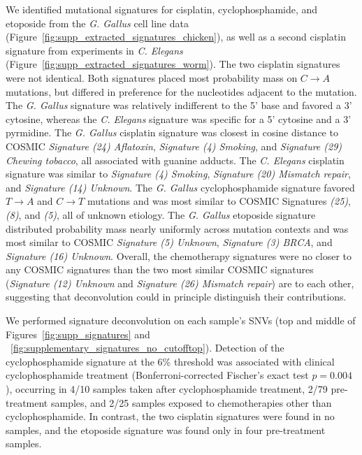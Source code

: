 We identified mutational signatures for cisplatin, cyclophosphamide, and etoposide from the \textit{G. Gallus} cell line data (Figure~\ref{fig:supp_extracted_signatures_chicken}), as well as a second cisplatin signature from experiments in \textit{C. Elegans} (Figure~\ref{fig:supp_extracted_signatures_worm}). The two cisplatin signatures were not identical. Both signatures placed most probability mass on $C \rightarrow A$ mutations, but differed in preference for the nucleotides adjacent to the mutation. The \textit{G. Gallus} signature was relatively indifferent to the 5' base and favored a 3' cytosine, whereas the \textit{C. Elegans} signature was specific for a 5' cytosine and a 3' pyrmidine. The \textit{G. Gallus} cisplatin signature was closest in cosine distance to COSMIC \textit{Signature (24) Aflatoxin}, \textit{Signature (4) Smoking}, and \textit{Signature (29) Chewing tobacco}, all associated with guanine adducts. The \textit{C. Elegans} cisplatin signature was similar to \textit{Signature (4) Smoking}, \textit{Signature (20) Mismatch repair}, and \textit{Signature (14) Unknown}. The \textit{G. Gallus} cyclophosphamide signature favored $T \rightarrow A$ and $C \rightarrow T$ mutations and was most similar to COSMIC Signatures \textit{(25)}, \textit{(8)}, and \textit{(5)}, all of unknown etiology. The \textit{G. Gallus} etoposide signature distributed probability mass nearly uniformly across mutation contexts and was most similar to COSMIC \textit{Signature (5) Unknown}, \textit{Signature (3) BRCA}, and \textit{Signature (16) Unknown}. Overall, the chemotherapy signatures were no closer to any COSMIC signatures than the two most similar COSMIC signatures (\textit{Signature (12) Unknown} and \textit{Signature (26) Mismatch repair}) are to each other, suggesting that deconvolution could in principle distinguish their contributions.

We performed signature deconvolution on each sample's SNVs (top and middle of Figures~\ref{fig:supp_signatures} and ~\ref{fig:supplementary_signatures_no_cutofftop}). Detection of the cyclophosphamide signature at the 6\% threshold was associated with clinical cyclophosphamide treatment (Bonferroni-corrected Fischer's exact test $p = 0.004$), occurring in 4/10 samples taken after cyclophosphamide treatment, 2/79 pre-treatment samples, and 2/25 samples exposed to chemotherapies other than cyclophosphamide. In contrast, the two cisplatin signatures were found in no samples, and the etoposide signature was found only in four pre-treatment samples.

